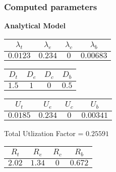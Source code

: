 \documentclass{article}
\begin{document}
\subsubsection{Computed parameters}
\begin{minipage}{0.5\textwidth}
\centering	\textbf{Analytical Model}
\begin{table}[H]
\centering
\begin{tabular}{@{}cccc@{}}
\toprule
$\lambda_t$ & $\lambda_e$ & $\lambda_c$ & $\lambda_b$\\
\midrule
$0.0123$ & $0.234$ & $0$ & $0.00683$\\
\bottomrule
\end{tabular}
\end{table}\begin{table}[H]
\centering
\begin{tabular}{@{}cccc@{}}
\toprule
$D_t$ & $D_e$ & $D_c$ & $D_b$\\
\midrule
$1.5$ & $1$ & $0$ & $0.5$\\
\bottomrule
\end{tabular}
\end{table}\begin{table}[H]
\centering
\begin{tabular}{@{}cccc@{}}
\toprule
$U_t$ & $U_e$ & $U_c$ & $U_b$\\
\midrule
$0.0185$ & $0.234$ & $0$ & $0.00341$\\
\bottomrule
\end{tabular}
\end{table}
\centering Total Utlization Factor = $0.25591$
\begin{table}[H]
\centering
\begin{tabular}{@{}cccc@{}}
\toprule
$R_t$ & $R_e$ & $R_c$ & $R_b$\\
\midrule
$2.02$ & $1.34$ & $0$ & $0.672$\\
\bottomrule
\end{tabular}
\end{table}
\end{minipage}
\end{document}
